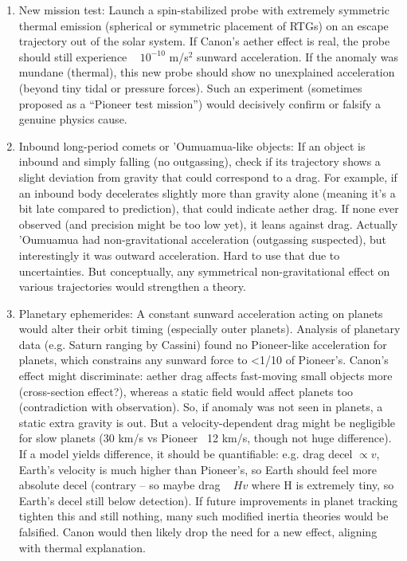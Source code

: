 \documentclass[11pt]{article}
\begin{document}
\begin{enumerate}

\item 
New mission test: Launch a spin-stabilized probe with extremely symmetric thermal emission (spherical or symmetric placement of RTGs) on an escape trajectory out of the solar system. If Canon’s aether effect is real, the probe should still experience ~ $10^{-10}$ m/s$^2$ sunward acceleration. If the anomaly was mundane (thermal), this new probe should show no unexplained acceleration (beyond tiny tidal or pressure forces). Such an experiment (sometimes proposed as a “Pioneer test mission”) would decisively confirm or falsify a genuine physics cause.




\item 
Inbound long-period comets or ’Oumuamua-like objects: If an object is inbound and simply falling (no outgassing), check if its trajectory shows a slight deviation from gravity that could correspond to a drag. For example, if an inbound body decelerates slightly more than gravity alone (meaning it’s a bit late compared to prediction), that could indicate aether drag. If none ever observed (and precision might be too low yet), it leans against drag. Actually ’Oumuamua had non-gravitational acceleration (outgassing suspected), but interestingly it was outward acceleration. Hard to use that due to uncertainties. But conceptually, any symmetrical non-gravitational effect on various trajectories would strengthen a theory.




\item 
Planetary ephemerides: A constant sunward acceleration acting on planets would alter their orbit timing (especially outer planets). Analysis of planetary data (e.g. Saturn ranging by Cassini) found no Pioneer-like acceleration for planets, which constrains any sunward force to <1/10 of Pioneer’s. Canon’s effect might discriminate: aether drag affects fast-moving small objects more (cross-section effect?), whereas a static field would affect planets too (contradiction with observation). So, if anomaly was not seen in planets, a static extra gravity is out. But a velocity-dependent drag might be negligible for slow planets (30 km/s vs Pioneer ~12 km/s, though not huge difference). If a model yields difference, it should be quantifiable: e.g. drag decel $\propto v$, Earth’s velocity is much higher than Pioneer’s, so Earth should feel more absolute decel (contrary – so maybe drag ~ $Hv$ where H is extremely tiny, so Earth’s decel still below detection). If future improvements in planet tracking tighten this and still nothing, many such modified inertia theories would be falsified. Canon would then likely drop the need for a new effect, aligning with thermal explanation.




\end{enumerate}
\end{document}
